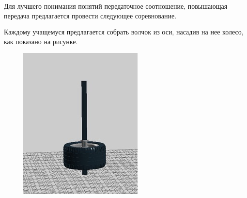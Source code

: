 Для лучшего понимания понятий передаточное соотношение, повышающая передача предлагается провести следующее соревнование.

Каждому учащемуся предлагается собрать волчок из оси, насадив на нее колесо, как показано на рисунке.
\begin{figure}[h!]
	\begin{center}
		\includegraphics[width=0.8\linewidth]{chapters/chapter6/images/6}
		\caption{}
		\label{ris:image6x6}
	\end{center}
\end{figure}

